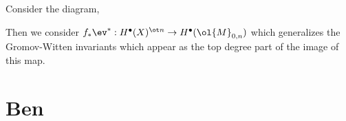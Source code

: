 \documentclass[12pt]{article}
\begin{document}
{\begin{example}
Consider the diagram,
\begin{center}
\end{center}
Then we consider $f_* \ev^* : H^\bullet(X)^{\ot n} \to H^\bullet(\ol{M}_{0,n})$ which generalizes the Gromov-Witten invariants which appear as the top degree part of the image of this map. 
\end{example}

\section{Ben}

}
\end{document}
